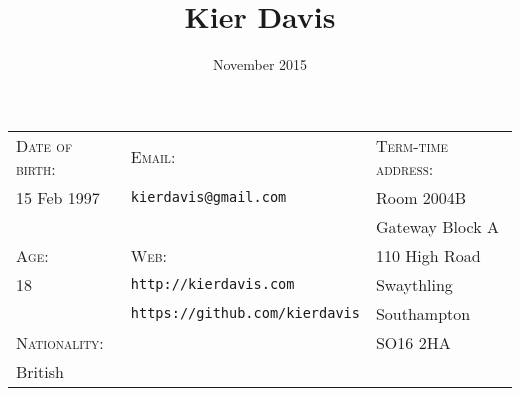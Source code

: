 \documentclass[a4paper,10pt]{article}
\title{\bfseries\Huge Kier Davis}
\author{November 2015}
\date{}
\begin{document}
\maketitle

\hrulefill
\vspace{1.1em}

{
\newcommand{\h}[1]{\textsc{#1}:}
\newcommand{\n}[1]{\hspace{.8em} #1}
\begin{tabu} to \textwidth {X[1,l] X[2,l] X[1.5,l]}
    \h{Date of birth}  & \h{Email}                                 & \h{Term-time address}    \\
    \n{15 Feb 1997}    & \n{\texttt{kierdavis@gmail.com}}          & \n{Room 2004B}           \\
                       &                                           & \n{Gateway Block A} \\
    \h{Age}            & \h{Web}                                   & \n{110 High Road}        \\
    \n{18}             & \n{\texttt{http://kierdavis.com}}         & \n{Swaythling}           \\
                       & \n{\texttt{https://github.com/kierdavis}} & \n{Southampton}          \\
    \h{Nationality}    &                                           & \n{SO16 2HA}             \\
    \n{British}        &                                           &                          \\
\end{tabu}
}

\hrulefill



\end{document}
